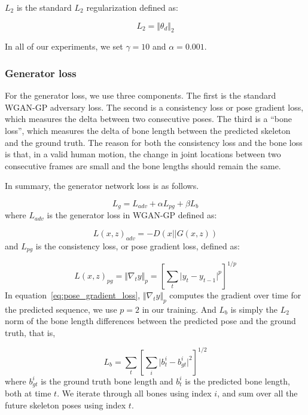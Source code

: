 \documentclass[10pt,twocolumn,letterpaper]{article}
\begin{document}
$L_{2}$ is the standard $L_{2}$ regularization defined as:

\begin{equation}
L_{2}=\Vert\theta_{d}\Vert_{2}
\label{eq:critic_l2}
\end{equation}

In all of our experiments, we set $\gamma = 10$ and $\alpha = 0.001$.

\subsubsection{Generator loss}

For the generator loss, we use three components. The first is the standard WGAN-GP adversary loss. The second is a consistency loss or pose gradient loss, which measures the delta between two consecutive poses. The third is a ``bone loss'', which measures the delta of bone length between the predicted skeleton and the ground truth. The reason for both the consistency loss and the bone loss is that, in a valid human motion, the change in joint locations between two consecutive frames are small and the bone lengths should remain the same.  

In summary, the generator network loss is as follows.

\begin{equation}
L_{g}=L_{adv}+\alpha L_{pg}+\beta L_{b}
\end{equation}
where $L_{adv}$ is the generator loss in WGAN-GP defined as:

\begin{equation}
L(x,z)_{adv}=-D(x||G(x,z))
\label{eq:g_loss}
\end{equation}
and $L_{pg}$ is the consistency loss, or pose gradient loss, defined as:

\begin{equation}
L(x,z)_{pg}=\Vert\nabla_{t}y\Vert_{p} = \left[\sum_{t}\vert y_{t}-y_{t-1}\vert^{p}\right]^{1/p}
\label{eq:pose_gradient_loss}
\end{equation}
In equation~\ref{eq:pose_gradient_loss}, $\Vert\nabla_{t}y\Vert_{p}$ computes the gradient over time for the predicted sequence, we use $p=2$ in our training. And $L_{b}$ is simply the $L_{2}$ norm of the bone length differences between the predicted pose and the ground truth, that is,

\begin{equation}
L_{b}=\sum_{t}\left[\sum_{i}\vert b^{i}_{t}-b^{i}_{gt}\vert^{2}\right]^{1/2}
\label{eq:bone_loss}
\end{equation}
where $b^{i}_{gt}$ is the ground truth bone length and $b^{i}_{t}$ is the predicted bone length, both at time $t$. We iterate through all bones using index $i$, and sum over all the future skeleton poses using index $t$.
\end{document}
